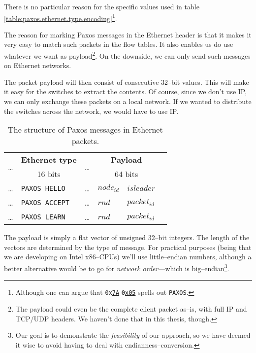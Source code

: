 There is no particular reason for the specific values used in table
\ref{table:paxos.ethernet.type.encoding}\footnote{Although one can argue
that \texttt{0x\underline{7A}} \texttt{0\underline{x05}} spells out \texttt{PAXOS}.}.

The reason for marking Paxos messages in the Ethernet header is that it
makes it very easy to match such packets in the flow tables.  It also
enables us do use whatever we want as payload\footnote{The payload could
even be the complete client packet as--is, with full IP and TCP/UDP
headers.  We haven't done that in this thesis, though.}.  On the downside,
we can only send such messages on Ethernet networks.

The packet payload will then consist of consecutive 32--bit values.
This will make it easy for the switches to extract the contents.
Of course, since we don't use IP, we can only exchange these packets on a
local network.  If we wanted to distribute the switches across the network,
we would have to use IP.

\begin{table}[H]
  \centering
  \begin{tabular}{l|l|l|l|l|l|}
    \hline
      \multirow{2}{*}{\dots} &
      \multicolumn{1}{|c|}{\textbf{Ethernet type}} &
      \multirow{2}{*}{\dots} &
      \multicolumn{2}{|c|}{\textbf{Payload}} \\

      &
      \multicolumn{1}{|c|}{16 bits} &
      &
      \multicolumn{2}{|c|}{64 bits} \\

    \hline
      \dots & \texttt{PAXOS HELLO}  &
      \dots & $node_{id}$ & $isleader$ \\

    \hline
      \dots & \texttt{PAXOS ACCEPT} &
      \dots & $rnd$ & $packet_{id}$ \\

    \hline
      \dots & \texttt{PAXOS LEARN} &
      \dots & $rnd$ & $packet_{id}$ \\

    \hline
  \end{tabular}

  \caption{The structure of Paxos messages in Ethernet packets.}
  \label{table:paxos.ethernet.packet}
\end{table}

The payload is simply a flat vector of unsigned 32--bit integers.  The length
of the vectors are determined by the type of message.  For practical
purposes (being that we are developing on Intel x86--CPUs) we'll use
little--endian numbers, although a better alternative would be to go for
\textit{network order}---which is big--endian\footnote{Our goal is to
demonstrate the \textit{feasibility} of our approach, so we have deemed it
wise to avoid having to deal with endianness--conversion.}.

